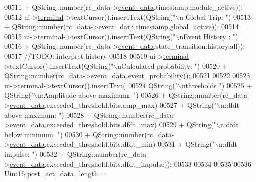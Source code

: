\begin{DoxyCode}
00511                            + QString::number(rc\_data->\hyperlink{a00008_a5a700ec4c240f4e86c5fb61aef8d983e}{event\_data}.timestamp.module\_active));
00512         ui->\hyperlink{a00027_aae71c46ea4546df5994735dee573b2dd}{terminal}->textCursor().insertText(QString(\textcolor{stringliteral}{"\(\backslash\)n      Global Trip: "})
00513                            + QString::number(rc\_data->\hyperlink{a00008_a5a700ec4c240f4e86c5fb61aef8d983e}{event\_data}.timestamp.global\_active));
00514 
00515         ui->\hyperlink{a00027_aae71c46ea4546df5994735dee573b2dd}{terminal}->textCursor().insertText(QString(\textcolor{stringliteral}{"\(\backslash\)nEvent History : "})
00516                            + QString::number(rc\_data->\hyperlink{a00008_a5a700ec4c240f4e86c5fb61aef8d983e}{event\_data}.state\_transition.history.all));
00517          \textcolor{comment}{//TODO: interpret history}
00518 
00519         ui->\hyperlink{a00027_aae71c46ea4546df5994735dee573b2dd}{terminal}->textCursor().insertText(QString(\textcolor{stringliteral}{"\(\backslash\)nCalculated probability: "})
00520                            + QString::number(rc\_data->\hyperlink{a00008_a5a700ec4c240f4e86c5fb61aef8d983e}{event\_data}.event\_probability));
00521   
00522 
00523         ui->\hyperlink{a00027_aae71c46ea4546df5994735dee573b2dd}{terminal}->textCursor().insertText(
00524                       QString(\textcolor{stringliteral}{"\(\backslash\)nthresholds                       "})
00525                     + QString(\textcolor{stringliteral}{"\(\backslash\)n:Amplitude above maximum: "})
00526                     + QString::number(rc\_data->\hyperlink{a00008_a5a700ec4c240f4e86c5fb61aef8d983e}{event\_data}.exceeded\_threshold.bits.amp\_max)
00527                     + QString(\textcolor{stringliteral}{"\(\backslash\)n:dfdt above maximum: "})
00528                     + QString::number(rc\_data->\hyperlink{a00008_a5a700ec4c240f4e86c5fb61aef8d983e}{event\_data}.exceeded\_threshold.bits.dfdt\_max)
00529                     + QString(\textcolor{stringliteral}{"\(\backslash\)n:dfdt below minimum: "})
00530                     + QString::number(rc\_data->\hyperlink{a00008_a5a700ec4c240f4e86c5fb61aef8d983e}{event\_data}.exceeded\_threshold.bits.dfdt\_min)
00531                     + QString(\textcolor{stringliteral}{"\(\backslash\)n:dfdt impulse: "})
00532                     + QString::number(rc\_data->\hyperlink{a00008_a5a700ec4c240f4e86c5fb61aef8d983e}{event\_data}.exceeded\_threshold.bits.dfdt\_impulse));
00533 
00534 
00535 
00536         \hyperlink{a00001_aae7407b021d43f7193a81a58cfb3e297}{Uint16} post\_act\_data\_length =

\end{DoxyCode}
